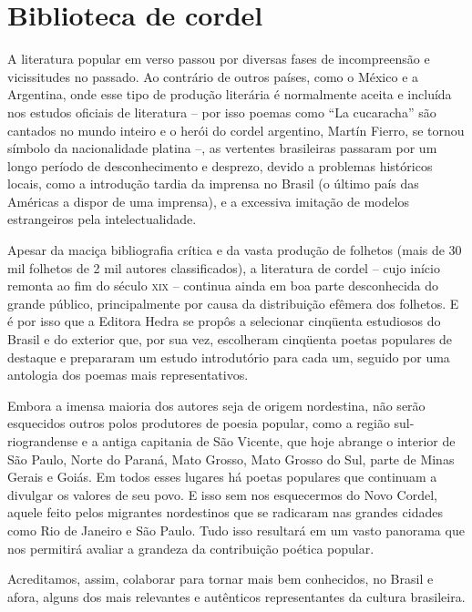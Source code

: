 \vspace*{.15\textheight}

\section{Biblioteca de cordel}


A literatura popular em verso passou por diversas fases de incompreensão e
vicissitudes no passado. Ao contrário de outros países, como o México e a
Argentina, onde esse tipo de produção literária é normalmente aceita e incluída
nos estudos oficiais de literatura -- por isso poemas como ``La cucaracha'' são
cantados no mundo inteiro e o herói do cordel argentino, Martín Fierro, se
tornou símbolo da nacionalidade platina \mbox{--,} as vertentes brasileiras passaram por
um longo período de desconhecimento e desprezo, devido a problemas históricos
locais, como a introdução tardia da imprensa no Brasil (o último país das
Américas a dispor de uma imprensa), e a excessiva imitação de modelos
estrangeiros pela intelectualidade. 

Apesar da maciça bibliografia crítica e da vasta produção de folhetos (mais de
30 mil folhetos de 2 mil autores classificados), a literatura de cordel -- cujo
início remonta ao fim do século \textsc{xix} -- continua ainda em boa parte desconhecida
do grande público, principalmente por causa da distribuição efêmera dos
folhetos. E é por isso que a Editora Hedra se propôs a selecionar cinqüenta
estudiosos do Brasil e do exterior que, por sua vez, escolheram cinqüenta poetas
populares de destaque e prepararam um estudo introdutório para cada um, seguido
por uma antologia dos poemas mais representativos. 

Embora a imensa maioria dos autores seja de origem nordestina, não serão
esquecidos outros polos produtores de poesia popular, como a região
sul-riograndense e a antiga capitania de São Vicente, que hoje abrange o
interior de São Paulo, Norte do Paraná, Mato Grosso, Mato Grosso do Sul, parte
de Minas Gerais e Goiás. Em todos esses lugares há poetas populares que
continuam a divulgar os valores de seu povo. E isso sem nos esquecermos do Novo
Cordel, aquele feito pelos migrantes nordestinos que se radicaram nas grandes
cidades como Rio de Janeiro e São Paulo. Tudo isso resultará em um vasto
panorama que nos permitirá avaliar a grandeza da contribuição poética popular. 

Acreditamos, assim, colaborar para tornar mais bem conhecidos, no Brasil e afora,
alguns dos mais relevantes e autênticos representantes da cultura brasileira. 


